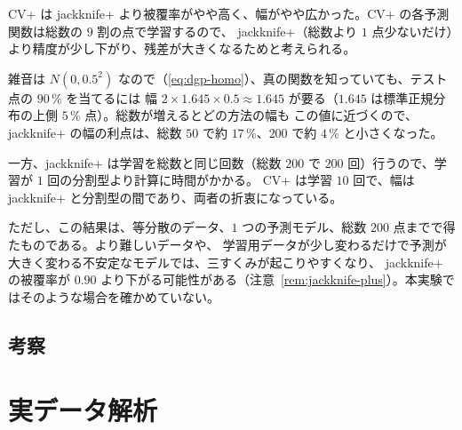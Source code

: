 \documentclass[a4paper,11pt]{jsarticle}
\theoremstyle{definition}
\theoremstyle{plain}
\theoremstyle{remark}
\begin{document}
CV+ は jackknife+ より被覆率がやや高く、幅がやや広かった。CV+ の各予測関数は総数の $9$ 割の点で学習するので、
jackknife+（総数より $1$ 点少ないだけ）より精度が少し下がり、残差が大きくなるためと考えられる。

雑音は $N(0,0.5^2)$ なので（\eqref{eq:dgp-homo}）、真の関数を知っていても、テスト点の $90\,\%$ を当てるには
幅 $2\times1.645\times0.5\approx1.645$ が要る（$1.645$ は標準正規分布の上側 $5\,\%$ 点）。総数が増えるとどの方法の幅も
この値に近づくので、jackknife+ の幅の利点は、総数 $50$ で約 $17\,\%$、$200$ で約 $4\,\%$ と小さくなった。

一方、jackknife+ は学習を総数と同じ回数（総数 $200$ で $200$ 回）行うので、学習が $1$ 回の分割型より計算に時間がかかる。
CV+ は学習 $10$ 回で、幅は jackknife+ と分割型の間であり、両者の折衷になっている。

ただし、この結果は、等分散のデータ、$1$ つの予測モデル、総数 $200$ 点までで得たものである。より難しいデータや、
学習用データが少し変わるだけで予測が大きく変わる不安定なモデルでは、三すくみが起こりやすくなり、
jackknife+ の被覆率が $0.90$ より下がる可能性がある（注意~\ref{rem:jackknife-plus}）。本実験ではそのような場合を確かめていない。


\clearpage
\subsection{考察}

\section{実データ解析}
\label{sec:real-data}
\end{document}
